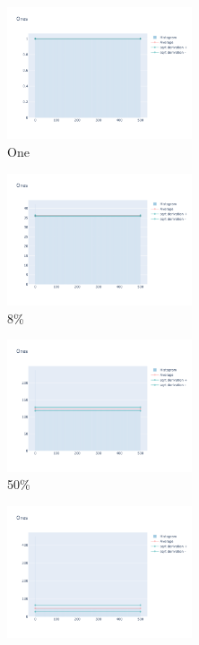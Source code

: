 \documentclass[12pt, fleqn]{report}                             %
\theoremstyle{break}                                            %
\begin{document}
      \begin{figure}[ht!]
        \centering
        \begin{subfigure}[b]{0.4\linewidth}
          \includegraphics[width=0.6\textwidth]{Images/12/dia-a.png}
          \caption{One}
        \end{subfigure}
        \begin{subfigure}[b]{0.4\linewidth}
          \includegraphics[width=0.6\textwidth]{Images/12/dia-b.png}
          \caption{8\%}
        \end{subfigure}
        \begin{subfigure}[b]{0.4\linewidth}
          \includegraphics[width=0.6\textwidth]{Images/12/dia-c.png}
          \caption{50\%}
        \end{subfigure}
        \begin{subfigure}[b]{0.4\linewidth}
          \includegraphics[width=0.6\textwidth]{Images/12/dia-d.png}

\end{subfigure}
\end{figure}
\end{document}
